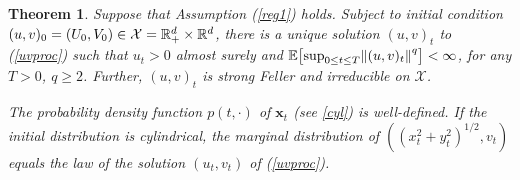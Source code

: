 \documentclass[11pt, twoside]{report}
\newtheorem{theorem}{Theorem}[section]
\renewcommand{\vec}[1]{{\mathbf{#1}}}
\begin{document}
\begin{theorem} \label{wp}  Suppose that Assumption (\ref{reg1}) holds. Subject to initial condition $(u,v)_0=(U_0,V_0)\in \mathcal{X}=\mathbb{R}_+^d\times \mathbb R^d$,
there is a unique solution $(u, v)_t$ to (\ref{uvproc}) such that  $u_t>0$ almost surely and $\mean{\sup_{0\le t\le T} \norm{(u,v)_t}^q}<\infty$, for any $T>0$, $q\ge 2$. Further, $(u,v)_t$ is strong Feller and irreducible on $\mathcal X$.

The probability density function $p(t,\cdot)$ of $\vec x_t$ (see \ref{cyl}) is well-defined. 
If the initial distribution is cylindrical, the marginal distribution of $((x_t^2+y_t^2)^{1/2},v_t)$ equals the law of the solution $(u_t,v_t)$ of (\ref{uvproc}).
\end{theorem}
\end{document}
